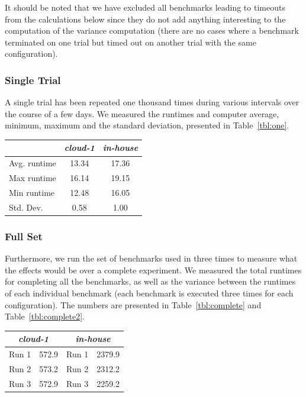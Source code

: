 \documentclass[a4paper]{IEEEtran}
\begin{document}
It should be noted that we have excluded all benchmarks leading to
timeouts from the calculations below since they do not add anything
interesting to the computation of the variance computation (there are
no cases where a benchmark terminated on one trial but timed out on
another trial with the same configuration).

\subsubsection{Single Trial}
A single trial has been repeated one thousand times during various
intervals over the course of a few days. We measured the runtimes and
computer average, minimum, maximum and the standard deviation,
presented in Table~\ref{tbl:one}.


\begin{Figure}
  \centering
  \begin{tabular}{|l|c|c|}
    \hline
    & \emph{cloud-1} & \emph{in-house} \\
  \hline
  Avg. runtime &  13.34 & 17.36\\
  \hline
  Max runtime & 16.14 & 19.15 \\
  \hline
  Min runtime & 12.48 & 16.05\\
  \hline      
  Std. Dev. & 0.58 & 1.00 \\
  \hline
\end{tabular}
\label{tbl:one}
\end{Figure}

\subsubsection{Full Set}
Furthermore, we run the set of benchmarks used in \cite{uppsat} three
times to measure what the effects would be over a complete
experiment. We measured the total runtimes for completing all the benchmarks, as well as the variance between the runtimes of each individual benchmark (each benchmark is executed three times for each configuration). The numbers are presented in Table~\ref{tbl:complete} and Table~\ref{tbl:complete2}.

\begin{Figure}
  \centering
\begin{tabular}{|l|c|l|c|}
  \hline
  \multicolumn{2}{|c|}{\emph{cloud-1}} & \multicolumn{2}{c|}{\emph{in-house}} \\
  \hline
  Run 1 &  572.9 & Run 1 & 2379.9 \\
  \hline
  Run 2 & 573.2 & Run 2 & 2312.2 \\
  \hline
  Run 3 & 572.9 & Run 3 & 2259.2 \\
  \hline      
\end{tabular}
\label{tbl:complete}
\end{Figure}
\end{document}
